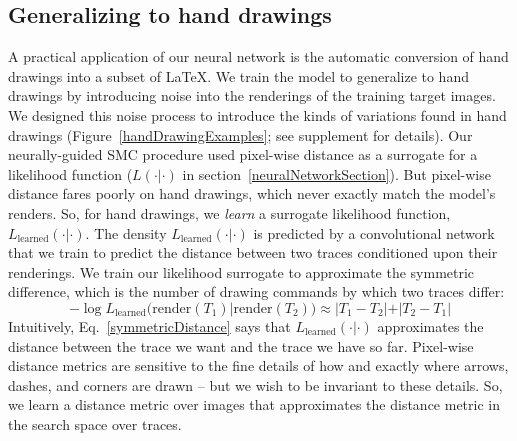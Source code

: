 \documentclass{article}
\begin{document}
\subsection{Generalizing to hand drawings}
A practical application of our neural network is the automatic conversion of hand drawings into a subset of \LaTeX.
 We train the model
to generalize to hand drawings by introducing noise into the
renderings of the training target images.
We designed this noise process to introduce the kinds of variations found in hand drawings (Figure~\ref{handDrawingExamples}; see supplement for details).
Our neurally-guided SMC procedure
used pixel-wise distance as a surrogate for a likelihood function ($L(\cdot|\cdot)$ in section~\ref{neuralNetworkSection}).
But pixel-wise distance fares poorly on hand drawings, which never exactly match
the model's renders.
So, for hand drawings,
we \emph{learn} a surrogate likelihood function,
$L_{\text{learned}}(\cdot|\cdot)$.
The density $L_{\text{learned}}(\cdot|\cdot)$ is predicted by a convolutional network that we train to predict
the distance between two traces conditioned upon their renderings.
We train our likelihood surrogate to approximate the symmetric difference,
which is  the number of drawing commands by which two traces differ:
\begin{equation}
-\log L_{\text{learned}}(\text{render}(T_1)|\text{render}(T_2))\approx |T_1 - T_2| + |T_2 - T_1|\label{symmetricDistance}
\end{equation}
Intuitively, Eq.~\ref{symmetricDistance} says that
$L_{\text{learned}}(\cdot|\cdot)$ approximates the distance between
the trace we want and the trace we have so far.  Pixel-wise distance
metrics are sensitive to the fine details of how and exactly where
arrows, dashes, and corners are drawn -- but we wish to be invariant
to these details. So, we learn a distance metric over images that
approximates the distance metric in the search space over traces.
\end{document}
